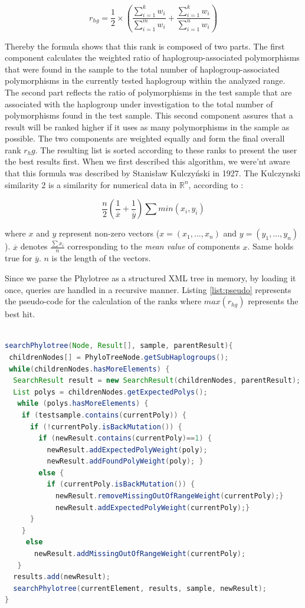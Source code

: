 \begin{equation}
	r_{hg} = \frac{1}{2} \times \left(\frac{\sum^{k}_{i=1} w_i}{\sum^{m}_{i=1} w_i} + \frac{\sum^{k}_{i=1} w_i}{\sum^{n}_{i=1} w_i}\right)
\end{equation}

Thereby the formula shows that this rank is composed of two parts. The first component calculates the weighted ratio of haplogroup-associated polymorphisms that were found in the sample to the total number of haplogroup-associated polymorphisms in the currently tested haplogroup within the analyzed range. The second part reflects the ratio of polymorphisms in the test sample that are associated with the haplogroup under investigation to the total number of polymorphisms found in the test sample. This second component assures that a result will be ranked higher if it uses as many polymorphisms in the sample as possible. The two components are weighted equally and form the final overall rank $r_hg$. The resulting list is sorted according to these ranks to present the user the best results first. When we first described this algorithm, we were'nt aware that this formula was described by Stanisław Kulczyński in 1927. The Kulczynski similarity 2 is a similarity for numerical data in $\mathbb{R}^n$, according to \cite{Deza2009}:
 
\begin{equation}
\frac{n}{2}\left(\frac{1}{\overline x}+\frac{1}{\overline y}\right) \sum{min(x_i, y_i)}
\end{equation}

where $x$ and $y$ represent non-zero vectors ($x=(x_1,...,x_n)$ and $y=(y_1,...,y_n)$). $\overline x$ denotes $\frac{\sum{x_i}}{n}$ corresponding to the \textit{mean value} of components $x$. Same holds true for $\overline y$. $n$ is the length of the vectors.

Since we parse the Phylotree as a structured XML tree in memory, by loading it once, queries are handled in a recursive manner. Listing \ref{list:pseudo} represents the pseudo-code for the calculation of the ranks where $max(r_{hg})$ represents the best hit.

\begin{lstlisting}[caption={HaploGrep recursive search},label={list:pseudo},language=Java]

searchPhylotree(Node, Result[], sample, parentResult){
 childrenNodes[] = PhyloTreeNode.getSubHaplogroups();
 while(childrenNodes.hasMoreElements) {
  SearchResult result = new SearchResult(childrenNodes, parentResult);
  List polys = childrenNodes.getExpectedPolys();
   while (polys.hasMoreElements) {
    if (testsample.contains(currentPoly)) {
      if (!currentPoly.isBackMutation()) {
        if (newResult.contains(currentPoly)==1) {
          newResult.addExpectedPolyWeight(poly);
          newResult.addFoundPolyWeight(poly); }
        else {
          if (currentPoly.isBackMutation()) {
            newResult.removeMissingOutOfRangeWeight(currentPoly);}
            newResult.addExpectedPolyWeight(currentPoly);}
      }
    }
     else
       newResult.addMissingOutOfRangeWeight(currentPoly);
   }
  results.add(newResult);
  searchPhylotree(currentElement, results, sample, newResult);
}
\end{lstlisting}

